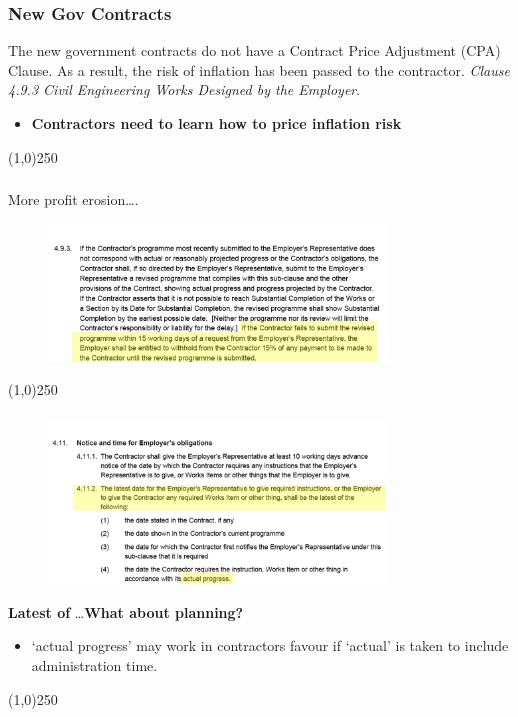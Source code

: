 \begin{frame}
\frametitle{New Gov Contracts}
The new government contracts do not have a Contract Price Adjustment (CPA) Clause.  As a result, the risk of inflation has been passed to the contractor.  \textit{Clause 4.9.3 Civil Engineering Works Designed by the Employer}.
\begin{itemize}
	\item \textbf{Contractors need to learn how to price inflation risk}
\end{itemize}
\end{frame}
\begin{center}\line(1,0){250}\end{center}







\begin{frame}
\frametitle{}
More profit erosion….\\
\begin{figure}
 	\centering
 		\includegraphics[width = 9cm]{images/dofsch.jpg}
 	\label{fig:dofsch}
 \end{figure}
\end{frame}
\begin{center}\line(1,0){250}\end{center}







\begin{frame}
\frametitle{}
\begin{figure}
	\centering
		\includegraphics[width = 9cm]{images/dofsch2.jpg}
	\label{fig:dofsch2}
\end{figure}

\textbf{Latest of} \ldots  \textbf{What about planning?}
\begin{itemize}
	\item ‘actual progress’ may work in contractors favour if ‘actual’ is taken to include administration time.
\end{itemize}
 
\end{frame}
\begin{center}\line(1,0){250}\end{center}







